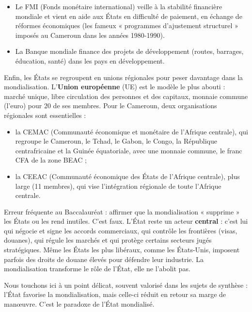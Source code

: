 \documentclass[11pt]{article}
\newcommand{\cle}[1]{{\popxbold\color{popdark}#1}}
\newcounter{popsec}
\newcounter{popsub}
\newcommand{\courssub}[1]{%
  \stepcounter{popsub}%
  \par\vspace{9pt}\noindent{\popxbold\fontsize{11.5}{13}\selectfont\color{popink}{\color{poporange}\thepopsec.\thepopsub}\hspace{6pt}#1}\par\nopagebreak\vspace{4pt}
}
\begin{document}
\begin{itemize}
\item Le \cle{FMI} (Fonds monétaire international) veille à la stabilité financière mondiale et vient en aide aux États en difficulté de paiement, en échange de réformes économiques (les fameux « programmes d'ajustement structurel » imposés au Cameroun dans les années 1980-1990).
\item La \cle{Banque mondiale} finance des projets de développement (routes, barrages, éducation, santé) dans les pays en développement.
\end{itemize}

Enfin, les États se regroupent en \cle{unions régionales} pour peser davantage dans la mondialisation. L'\textbf{Union européenne} (UE) est le modèle le plus abouti : marché unique, libre circulation des personnes et des capitaux, monnaie commune (l'euro) pour 20 de ses membres. Pour le Cameroun, deux organisations régionales sont essentielles :

\begin{itemize}
\item la \cle{CEMAC} (Communauté économique et monétaire de l'Afrique centrale), qui regroupe le Cameroun, le Tchad, le Gabon, le Congo, la République centrafricaine et la Guinée équatoriale, avec une monnaie commune, le franc CFA de la zone BEAC ;
\item la \cle{CEEAC} (Communauté économique des États de l'Afrique centrale), plus large (11 membres), qui vise l'intégration régionale de toute l'Afrique centrale.
\end{itemize}

\begin{attention}
Erreur fréquente au Baccalauréat : affirmer que la mondialisation « supprime » les États ou les rend inutiles. C'est faux. L'État reste un acteur \textbf{central} : c'est lui qui négocie et signe les accords commerciaux, qui contrôle les frontières (visas, douanes), qui régule les marchés et qui protège certains secteurs jugés stratégiques. Même les États les plus libéraux, comme les États-Unis, imposent parfois des droits de douane élevés pour défendre leur industrie. La mondialisation transforme le rôle de l'État, elle ne l'abolit pas.
\end{attention}

\courssub{Le paradoxe de l'État mondialisé}

Nous touchons ici à un point délicat, souvent valorisé dans les sujets de synthèse : l'État favorise la mondialisation, mais celle-ci réduit en retour sa marge de manœuvre. C'est le \cle{paradoxe de l'État mondialisé}.
\end{document}
